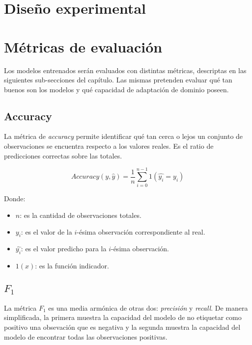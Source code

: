 \section{Dise\~{n}o experimental}

\lipsum[1]

\section{M\'etricas de evaluaci\'on}

Los modelos entrenados ser\'an evaluados con distintas m\'etricas, descriptas en las siguientes sub-secciones del
cap\'itulo. Las mismas pretenden evaluar qu\'e tan buenos son los modelos y qu\'e capacidad de adaptaci\'on de dominio
poseen.

\subsection{Accuracy}

La m\'etrica de {\it accuracy} permite identificar qu\'e tan cerca o lejos un conjunto de observaciones se encuentra
respecto a los valores reales. Es el ratio de predicciones correctas sobre las totales.

\begin{equation}
    Accuracy(y, \hat{y}) = \frac{1}{n} \sum_{i=0}^{n-1} 1(\hat{y_{i}}=y_{i})
\end{equation}

Donde:
\begin{itemize}
    \item $n$: es la cantidad de observaciones totales.
    \item $y_{i}$: es el valor de la ${i}$-\'esima observaci\'on correspondiente al real.
    \item $\hat{y_{i}}$: es el valor predicho para la ${i}$-\'esima observaci\'on.
    \item $1(x)$: es la funci\'on indicador.
\end{itemize}

\subsection{$F_{1}$}

La m\'etrica $F_{1}$ es una media arm\'onica de otras dos: {\it precisi\'on} y {\it recall}. De manera simplificada, la
primera muestra la capacidad del modelo de no etiquetar como positivo una obsevaci\'on que es negativa y la segunda
muestra la capacidad del modelo de encontrar todas las observaciones positivas.

